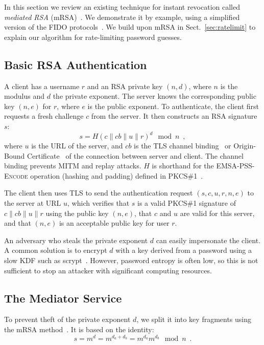 \documentclass{llncs}
\newcommand*{\concat}{\mathbin{\|}}
\begin{document}
In this section we review an existing technique for instant revocation called \emph{mediated RSA}
(mRSA)~\cite{Boneh01,Kutyiowski12}. We demonstrate it by example, using a simplified version of the
FIDO protocols~\cite{FIDOOverview}. We build upon mRSA in Sect.~\ref{sec:ratelimit} to explain our
algorithm for rate-limiting password guesses.

\subsection{Basic RSA Authentication}\label{sec:signature}

A client has a username $r$ and an RSA private key $(n, d)$, where $n$ is the modulus and $d$ the
private exponent. The server knows the corresponding public key $(n, e)$ for $r$, where $e$ is the
public exponent. To authenticate, the client first requests a fresh challenge $c$ from the server.
It then constructs an RSA signature $s$:
\begin{equation}\label{eq:signature}
s = H(c \concat \mathit{cb} \concat u \concat r)^d \mod n \enspace,
\end{equation}
where $u$ is the URL of the server, and $\mathit{cb}$ is the TLS channel
binding~\cite{ChannelBinding} or Origin-Bound Certificate~\cite{Dietz12} of the connection between
server and client. The channel binding prevents MITM and replay attacks. $H$ is shorthand for the
\textsc{EMSA-PSS-Encode} operation (hashing and padding) defined in PKCS\#1~\cite{PKCS1}.

The client then uses TLS to send the authentication request $(s, c, u, r, n, e)$ to the server at
URL $u$, which verifies that $s$ is a valid PKCS\#1 signature of
$c \concat \mathit{cb} \concat u \concat r$ using the public key $(n, e)$, that $c$ and $u$ are
valid for this server, and that $(n, e)$ is an acceptable public key for user $r$.

An adversary who steals the private exponent $d$ can easily impersonate the client. A common
solution is to encrypt $d$ with a key derived from a password using a slow KDF such as
scrypt~\cite{Percival09}. However, password entropy is often low, so this is not sufficient to stop
an attacker with significant computing resources.

\subsection{The Mediator Service}\label{sec:mediator}

To prevent theft of the private exponent $d$, we split it into key fragments using the mRSA
method~\cite{Boneh01,Kutyiowski12}. It is based on the identity:
\begin{equation}
s = m^d = m^{d_a + d_b} = m^{d_a} m^{d_b} \mod n \enspace.
\end{equation}
\end{document}
